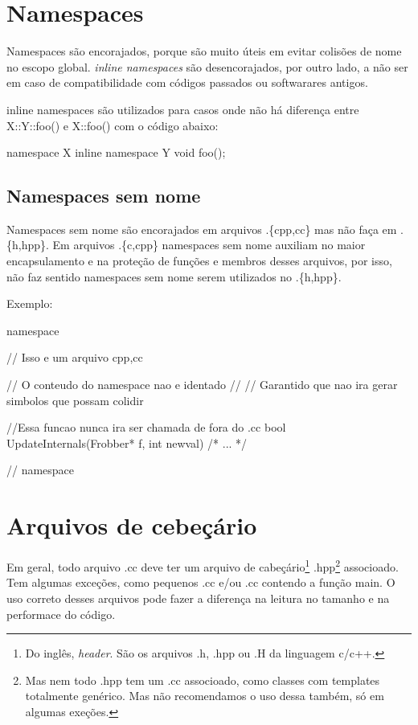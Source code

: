 \documentclass{article}
\begin{document}
\section{Namespaces}

Namespaces são encorajados, porque são muito úteis em evitar colisões de nome no escopo global. \emph{inline namespaces} são desencorajados, por outro lado, a não ser em caso de compatibilidade com códigos passados ou softwarares antigos.

inline namespaces são utilizados para casos onde não há diferença entre X::Y::foo() e X::foo() com o código abaixo:

\begin{code}
namespace X{
	inline namespace Y{
		void foo();
	}
}
\end{code}

\subsection{Namespaces sem nome}
Namespaces sem nome são encorajados em arquivos .\{cpp,cc\} mas não faça em .\{h,hpp\}. Em arquivos .\{c,cpp\} namespaces sem nome auxiliam no maior encapsulamento e na proteção de funções e membros desses arquivos, por isso, não faz sentido namespaces sem nome serem utilizados no .\{h,hpp\}.

Exemplo:
\begin{code}
namespace {                           // Isso e um arquivo {cpp,cc}

// O conteudo do namespace nao e identado
//
// Garantido que nao ira gerar simbolos que possam colidir

//Essa funcao nunca ira ser chamada de fora do .cc
bool UpdateInternals(Frobber* f, int newval) {
	/*
	...
	*/
}

}  // namespace
\end{code}

\section{Arquivos de cebeçário}

Em geral, todo arquivo .cc deve ter um arquivo de cabeçário\footnote{Do inglês, \emph{header}. São os arquivos .h, .hpp ou .H da linguagem c/c++.} .hpp\footnote{Mas nem todo .hpp tem um .cc associoado, como classes com templates totalmente genérico. Mas não recomendamos o uso dessa também, só em algumas exeções.} associoado. Tem algumas exceções, como pequenos .cc e/ou .cc contendo a função main. O uso correto desses arquivos pode fazer a diferença na leitura no tamanho e na performace do código.
\end{document}
